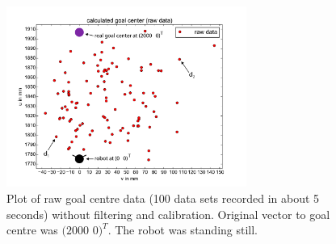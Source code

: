 \documentclass[lnicst,a4paper]{svmultln}
\begin{document}
\begin{figure}
 	\centerline{\includegraphics[width=0.7\textwidth]{noise_data_plot.pdf}}
	{\caption{Plot of raw goal centre data (100 data sets recorded in about 5 seconds) without filtering and calibration. Original vector to goal centre was $(2000$  $0)^T$. The robot was standing still.}
	\label{fig:noise1}}
\end{figure}
\end{document}

